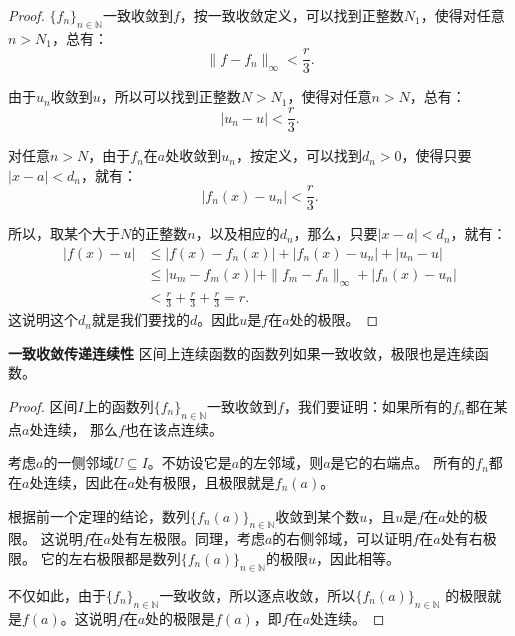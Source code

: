 \documentclass[12pt,UTF8]{ctexbook}
\begin{document}
\begin{appendix}
\begin{proof}
    $\{f_n\}_{n\in\mathbb{N}}$一致收敛到$f$，按一致收敛定义，可以找到正整数$N_1$，使得对任意$n>N_1$，总有：
    $$ \| f - f_n\|_{\infty} < \frac{r}{3}.$$

    由于$u_n$收敛到$u$，所以可以找到正整数$N>N_1$，使得对任意$n>N$，总有：
    $$ |u_n - u| < \frac{r}{3}.$$
    
    对任意$n>N$，由于$f_n$在$a$处收敛到$u_n$，按定义，可以找到$d_n > 0$，使得只要$|x - a| < d_n$，就有：
    $$ |f_n(x) - u_n| < \frac{r}{3}.$$

    所以，取某个大于$N$的正整数$n$，以及相应的$d_n$，那么，只要$|x - a| < d_n$，就有：
    \begin{align*}
        |f(x) - u| &\leqslant |f(x) - f_n(x)| + |f_n(x) - u_n| + |u_n - u| \\
        &\leqslant |u_m - f_m(x)| + \| f_m - f_n\|_{\infty} + |f_n(x) - u_n| \\
        &< \frac{r}{3} + \frac{r}{3} + \frac{r}{3} = r.
    \end{align*}
    这说明这个$d_n$就是我们要找的$d$。因此$u$是$f$在$a$处的极限。
\end{proof}

\begin{tm}{\textbf{一致收敛传递连续性}}
    区间上连续函数的函数列如果一致收敛，极限也是连续函数。
\end{tm}

\begin{proof}
    区间$I$上的函数列$\{f_n\}_{n\in\mathbb{N}}$一致收敛到$f$，我们要证明：如果所有的$f_n$都在某点$a$处连续，
    那么$f$也在该点连续。

    考虑$a$的一侧邻域$U\subseteq I$。不妨设它是$a$的左邻域，则$a$是它的右端点。
    所有的$f_n$都在$a$处连续，因此在$a$处有极限，且极限就是$f_n(a)$。

    根据前一个定理的结论，数列$\{f_n(a)\}_{n\in\mathbb{N}}$收敛到某个数$u$，且$u$是$f$在$a$处的极限。
    这说明$f$在$a$处有左极限。同理，考虑$a$的右侧邻域，可以证明$f$在$a$处有右极限。
    它的左右极限都是数列$\{f_n(a)\}_{n\in\mathbb{N}}$的极限$u$，因此相等。
    
    不仅如此，由于$\{f_n\}_{n\in\mathbb{N}}$一致收敛，所以逐点收敛，所以$\{f_n(a)\}_{n\in\mathbb{N}}$
    的极限就是$f(a)$。这说明$f$在$a$处的极限是$f(a)$，即$f$在$a$处连续。

\end{proof}


\end{appendix}
\end{document}

